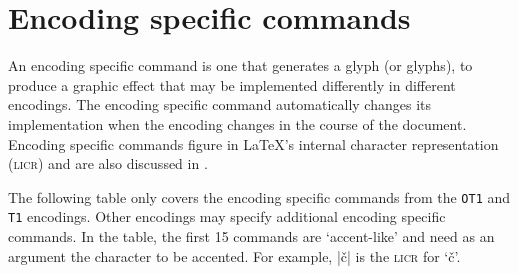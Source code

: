 \documentclass{ltxguide}[1994/11/20]
\providecommand{\Enc}[1]{\texttt{#1}}
\begin{document}
\iffalse
\begin{center}\tiny
\mbox{\dolctable{0}{65}\vrule
\dolctable{65}{128}\vrule
\dolctable{128}{193}\vrule
\dolctable{193}{256}}
\end{center}
\fi



\section{Encoding specific commands}

An encoding specific command is one that generates a glyph (or
glyphs), to produce a graphic effect that may be implemented
differently in different encodings.  The encoding specific command
automatically changes its implementation when the encoding changes in
the course of the document.  Encoding specific commands figure in
\LaTeX's internal character representation (\textsc{licr}) and are also
discussed in \cite[sec.~7.11.2, p.~442]{A-W:MG2004}.

The following table only covers the encoding specific commands from
the \Enc{OT1} and \Enc{T1} encodings. Other encodings may specify
additional encoding specific commands.  In the table, the first 15
commands are `accent-like' and need as an argument the character to be
accented.  For example, |\v{c}| is the \textsc{licr} for `\v{c}'.
\end{document}
